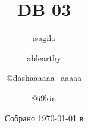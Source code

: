 \title{\huge \textbf{DB \LeC{} 03}}
\author{
  isagila
  \and
  ablearthy
  \and
  \href{https://t.me/dashaaaaaa_aaaaa}{@dashaaaaaa_aaaaa}
  \and
  \href{https://t.me/i9kin}{@i9kin}
}
\date{Собрано {\ddmmyyyydate\today} в \currenttime}
\newcommand{\githublink}{https://github.com/isagila/tesc}
